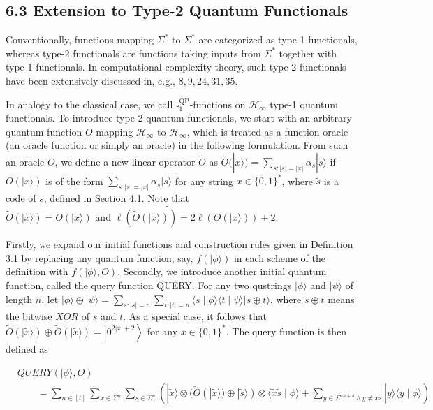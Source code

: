 \documentclass[10pt]{article}
\begin{document}
\subsection*{6.3 Extension to Type-2 Quantum Functionals}
Conventionally, functions mapping $\Sigma^{*}$ to $\Sigma^{*}$ are categorized as type-1 functionals, whereas type-2 functionals are functions taking inputs from $\Sigma^{*}$ together with type-1 functionals. In computational complexity theory, such type-2 functionals have been extensively discussed in, e.g., $8,9,24,31,35$.

In analogy to the classical case, we call $\square_{1}^{\mathrm{QP}}$-functions on $\mathcal{H}_{\infty}$ type-1 quantum functionals. To introduce type-2 quantum functionals, we start with an arbitrary quantum function $O$ mapping $\mathcal{H}_{\infty}$ to $\mathcal{H}_{\infty}$, which is treated as a function oracle (an oracle function or simply an oracle) in the following formulation. From such an oracle $O$, we define a new linear operator $\tilde{O}$ as $\tilde{O}(|\tilde{x}\rangle)=\sum_{s:|s|=|x|} \alpha_{s}|\tilde{s}\rangle$ if $O(|x\rangle)$ is of the form $\sum_{s:|s|=|x|} \alpha_{s}|s\rangle$ for any string $x \in\{0,1\}^{*}$, where $\tilde{s}$ is a code of $s$, defined in Section 4.1. Note that $\tilde{O}(|\tilde{x}\rangle)= \widetilde{O(|x\rangle) \text { and } \ell(\tilde{O}(|\tilde{x}\rangle))=2 \ell(O(|x\rangle))+2 \text {. }}$

Firstly, we expand our initial functions and construction rules given in Definition 3.1 by replacing any quantum function, say, $f(|\phi\rangle)$ in each scheme of the definition with $f(|\phi\rangle, O)$. Secondly, we introduce another initial quantum function, called the query function QUERY. For any two qustrings $|\phi\rangle$ and $|\psi\rangle$ of length $n$, let $|\phi\rangle \oplus|\psi\rangle=\sum_{s:|s|=n} \sum_{t:|t|=n}\langle s \mid \phi\rangle\langle t \mid \psi\rangle|s \oplus t\rangle$, where $s \oplus t$ means the bitwise $X O R$ of $s$ and $t$. As a special case, it follows that $\tilde{O}(|\tilde{x}\rangle) \oplus \tilde{O}(|\tilde{x}\rangle)=\left|0^{2|x|+2}\right\rangle$ for any $x \in\{0,1\}^{*}$. The query function is then defined as

$$
\begin{aligned}
& Q U E R Y(|\phi\rangle, O) \\
& \qquad=\sum_{n \in[t]} \sum_{x \in \Sigma^{n}} \sum_{s \in \Sigma^{n}}\left(|\tilde{x}\rangle \otimes(\tilde{O}(|\tilde{x}\rangle) \oplus|\tilde{s}\rangle) \otimes\langle\tilde{x} \tilde{s} \mid \phi\rangle+\sum_{y \in \Sigma^{4 n+4} \wedge y \neq \tilde{x} \tilde{s}}|y\rangle\langle y \mid \phi\rangle\right)
\end{aligned}
$$
\end{document}
